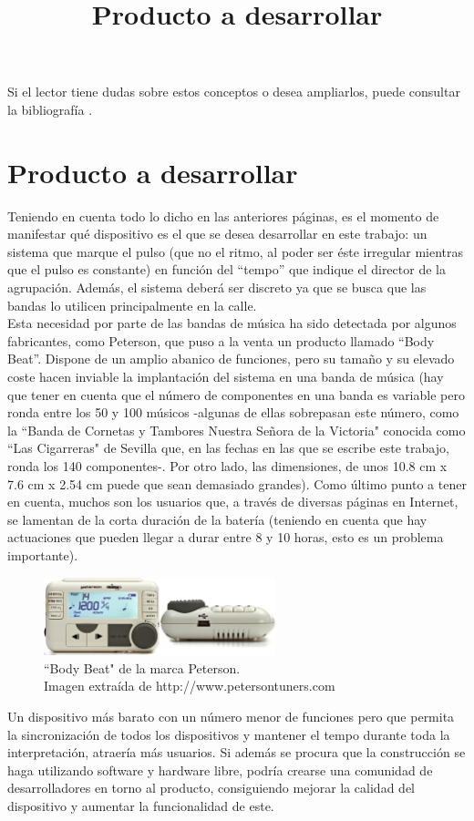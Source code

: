 Si el lector tiene dudas sobre estos conceptos o desea ampliarlos, puede consultar
la bibliografía \cite{teorMusica} \cite{lenguajeMusical}.\\


\title{Producto a desarrollar}
\section{Producto a desarrollar}

Teniendo en cuenta todo lo dicho en las anteriores páginas, es el momento de manifestar
qué dispositivo es el que se desea desarrollar en este trabajo: un sistema que marque el
pulso (que no el ritmo, al poder ser éste irregular mientras que el pulso es constante)
en función del “tempo” que indique el director de la agrupación. Además, el sistema deberá
ser discreto ya que se busca que las bandas lo utilicen principalmente en la calle.\\

Esta necesidad por parte de las bandas de música ha sido detectada por algunos fabricantes,
como Peterson, que puso a la venta un producto llamado “Body Beat”. Dispone de un amplio
abanico de funciones, pero su tamaño y su elevado coste hacen inviable la implantación del
sistema en una banda de música (hay que tener en cuenta que el número de componentes en una
banda es variable pero ronda entre los 50 y 100 músicos -algunas de ellas sobrepasan este número,
como la ``Banda de Cornetas y Tambores Nuestra Señora de la Victoria" conocida como ``Las Cigarreras"
de Sevilla \cite{cigarreras} que, en las fechas en las que se escribe este trabajo, ronda los 140 componentes-.
Por otro lado, las dimensiones, de unos 10.8 cm x 7.6 cm x 2.54 cm puede que sean demasiado grandes).
Como último punto a tener en cuenta, muchos son los usuarios que, a través de diversas páginas en Internet,
se lamentan de la corta duración de la batería (teniendo en cuenta que hay actuaciones que pueden llegar a
durar entre 8 y 10 horas, esto es un problema importante).\\


\begin{figure}[htb]
\centering
\captionsetup{justification=centering}
\includegraphics[width=0.6\textwidth]{./imagenes/bodybeat}
\caption{``Body Beat" de la marca Peterson.\\
\scriptsize{Imagen extraída de http://www.petersontuners.com} \label{fig:bodybeat}}
\end{figure}

Un dispositivo más barato con un número menor de funciones pero que permita la sincronización de todos
los dispositivos y mantener el tempo durante toda la interpretación, atraería más usuarios. Si además
se procura que la construcción se haga utilizando software y hardware libre, podría crearse una comunidad
de desarrolladores en torno al producto, consiguiendo mejorar la calidad del dispositivo y aumentar la funcionalidad
de este.\\
